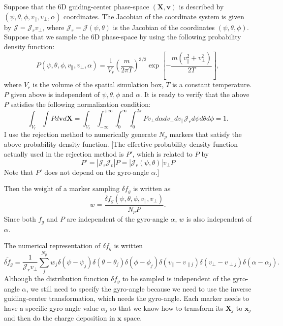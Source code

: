 \documentclass{llncs}
\begin{document}
Suppose that the 6D guiding-center phase-space $(\mathbf{X}, \mathbf{v})$ is
described by $(\psi, \theta, \phi, v_{\parallel}, v_{\perp}, \alpha)$
coordinates. The Jacobian of the coordinate system is given by $\mathcal{J} =
\mathcal{J}_r v_{\perp} \mathcal{}$, where $\mathcal{J}_r = \mathcal{J} (\psi,
\theta)$ is the Jacobian of the coordinates $(\psi, \theta, \phi)$. Suppose
that we sample the 6D phase-space by using the following probability density
function:
\begin{equation}
  \label{19-1-26-1} P (\psi, \theta, \phi, v_{\parallel}, v_{\perp}, \alpha) =
  \frac{1}{V_r} \left( \frac{m}{2 \pi T} \right)^{3 / 2} \exp \left[ - \frac{m
  (v_{\parallel}^2 + v_{\perp}^2)}{2 T} \right],
\end{equation}
where $V_r$ is the volume of the spatial simulation box, $T$ is a constant
temperature. $P$ given above is independent of $\psi, \theta, \phi$ and
$\alpha$. It is ready to verify that the above $P$ satisfies the following
normalization condition:
\begin{equation}
  \int_{V_r} \int P d\mathbf{v}d\mathbf{X}= \int_{V_r} \int_{- \infty}^{+
  \infty} \int_0^{\infty} \int_0^{2 \pi} P v_{\perp} d \alpha d v_{\perp} d
  v_{\parallel} \mathcal{J}_r d \psi d \theta d \phi = 1.
\end{equation}
I use the rejection method to numerically generate $N_p$ markers that satisfy
the above probability density function. [The effective probability density
function actually used in the rejection method is $P'$, which is related to
$P$ by
\begin{equation}
  P' = | \mathcal{J}_r \mathcal{J}_v | P = | \mathcal{J}_r (\psi, \theta) |
  v_{\perp} P
\end{equation}
Note that $P'$ does not depend on the gyro-angle $\alpha$.]

Then the weight of a marker sampling $\delta f_g$ is written as
\begin{equation}
  w = \frac{\delta f_g (\psi, \theta, \phi, v_{\parallel}, v_{\perp})}{N_p P}
  .
\end{equation}
Since both $f_g$ and $P$ are independent of the gyro-angle $\alpha$, $w$ is
also independent of $\alpha$.

The numerical representation of $\delta f_g$ is written
\begin{equation}
  \delta \tilde{f}_g = \frac{1}{\mathcal{J}_r v_{\perp}} \sum_j^{N_p} w_j
  \delta (\psi - \psi_j) \delta (\theta - \theta_j) \delta (\phi - \phi_j)
  \delta (v_{\parallel} - v_{\parallel j}) \delta (v_{\perp} - v_{\perp j})
  \delta (\alpha - \alpha_j) .
\end{equation}
Although the distribution function $\delta f_g$ to be sampled is independent
of the gyro-angle $\alpha$, we still need to specify the gyro-angle because we
need to use the inverse guiding-center transformation, which needs the
gyro-angle. Each marker needs to have a specific gyro-angle value $\alpha_j$
so that we know how to transform its $\mathbf{X}_j$ to $\mathbf{x}_j$ and then
do the charge deposition in $\mathbf{x}$ space.
\end{document}
